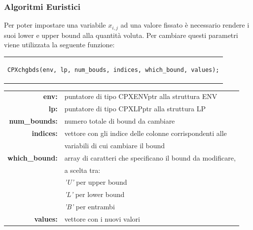 \begin{center}
\begin{center}
\subsubsection{Algoritmi Euristici}
Per poter impostare una variabile $x_{i,j}$ ad una valore fissato è necessario rendere i suoi lower e upper bound alla quantità voluta. Per cambiare questi parametri viene utilizzata la seguente funzione: 
\begin{center}
\begin{tabular}{c}
\begin{lstlisting}[linewidth=365pt, basicstyle=\footnotesize\sffamily,]    
CPXchgbds(env, lp, num_bouds, indices, which_bound, values);
\end{lstlisting}
\end{tabular}
\end{center}
\begin{table}[h]
\centering
\begin{tabular}{rl}
\textbf{env:} & {puntatore di tipo CPXENVptr alla struttura ENV}\\
\textbf{lp:} & {puntatore di tipo CPXLPptr alla struttura LP}\\
\textbf{num\_bounds:} & {numero totale di bound da cambiare}\\
\textbf{indices:} & {vettore con gli indice delle colonne corrispondenti alle}\\
&{variabili di cui cambiare il bound}\\
\textbf{which\_bound:} & {array di caratteri che specificano il bound da modificare,}\\
&{a scelta tra:}\\
&{\textit{'U'} per upper bound}\\
&{\textit{'L'} per lower bound}\\
&{\textit{'B'} per entrambi}\\
\textbf{values:} & {vettore con i nuovi valori}\\
\end{tabular}
\end{table}

\end{center}
\end{center}
